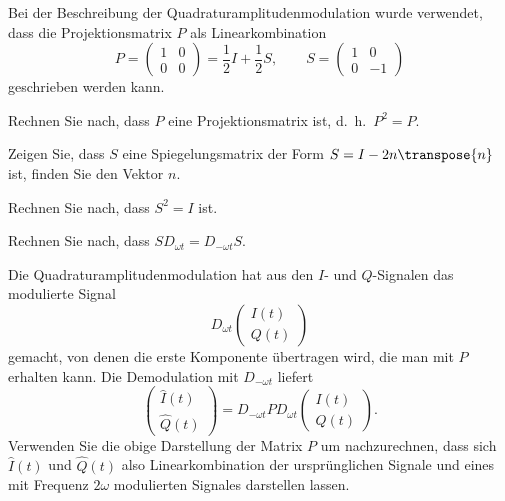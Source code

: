 Bei der Beschreibung der Quadraturamplitudenmodulation wurde
verwendet, dass die Projektionsmatrix $P$ als Linearkombination
\[
P
=
\begin{pmatrix}
1&0\\
0&0
\end{pmatrix}
=
\frac12I+\frac12S,
\qquad
S
=
\begin{pmatrix}
1&0\\
0&-1
\end{pmatrix}
\]
geschrieben werden kann.
\begin{teilaufgaben}
\item
Rechnen Sie nach, dass $P$ eine Projektionsmatrix ist, d.~h.~$P^2=P$.
\item
Zeigen Sie, dass $S$ eine Spiegelungsmatrix der Form $S=I-2n\transpose{n}$ ist,
finden Sie den Vektor $n$.
\item
Rechnen Sie nach, dass $S^2=I$ ist.
\item 
Rechnen Sie nach, dass $SD_{\omega t}=D_{-\omega t}S$.
\item
Die Quadraturamplitudenmodulation hat aus den $I$- und $Q$-Signalen
das modulierte Signal 
\[
D_{\omega t}\begin{pmatrix}I(t)\\Q(t)\end{pmatrix}
\]
gemacht, von denen die erste Komponente übertragen wird, die man mit
$P$ erhalten kann. 
Die Demodulation mit $D_{-\omega t}$ liefert
\[
\begin{pmatrix}
\hat{I}(t)\\
\hat{Q}(t)
\end{pmatrix}
=
D_{-\omega t}PD_{\omega t}
\begin{pmatrix}
I(t)\\
Q(t)
\end{pmatrix}.
\]
Verwenden Sie die obige Darstellung der Matrix $P$ um nachzurechnen,
dass sich $\hat{I}(t)$ und $\hat{Q}(t)$ also Linearkombination der
ursprünglichen Signale und eines mit Frequenz $2\omega$ modulierten
Signales darstellen lassen.
\end{teilaufgaben}


